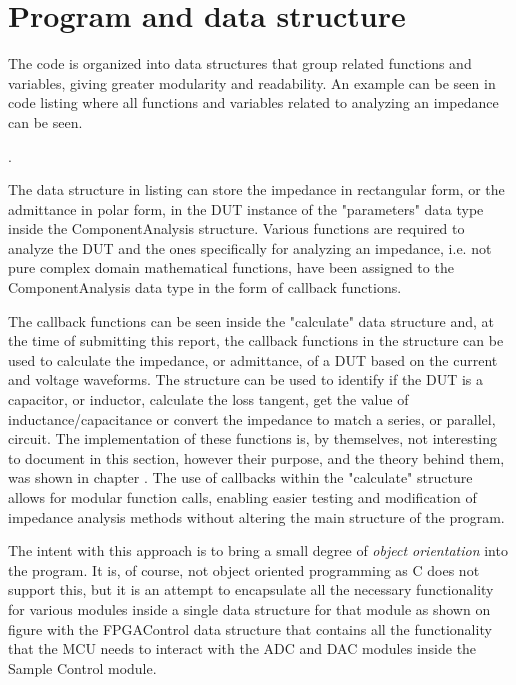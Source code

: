 \section{Program and data structure} \label{subsec:ProgramStructure}
The code is organized into data structures that group related functions and variables, giving greater modularity and readability. An example can be seen in code listing  where all functions and variables related to analyzing an impedance can be seen.

. 

The data structure in listing  can store the impedance in rectangular form, or the admittance in polar form, in the DUT instance of the "parameters" data type inside the ComponentAnalysis structure. Various functions are required to analyze the DUT and the ones specifically for analyzing an impedance, i.e. not pure complex domain mathematical functions, have been assigned to the ComponentAnalysis data type in the form of callback functions.

The callback functions can be seen inside the "calculate" data structure and, at the time of submitting this report, the callback functions in the structure can be used to calculate the impedance, or admittance, of a DUT based on the current and voltage waveforms. The structure can be used to identify if the DUT is a capacitor, or inductor, calculate the loss tangent, get the value of inductance/capacitance or convert the impedance to match a series, or parallel, circuit. The implementation of these functions is, by themselves, not interesting to document in this section, however their purpose, and the theory behind them, was shown in chapter . The use of callbacks within the "calculate" structure allows for modular function calls, enabling easier testing and modification of impedance analysis methods without altering the main structure of the program.

The intent with this approach is to bring a small degree of \textit{object orientation} into the program. It is, of course, not object oriented programming as C does not support this, but it is an attempt to encapsulate all the necessary functionality for various modules inside a single data structure for that module as shown on figure  with the FPGAControl data structure that contains all the functionality that the MCU needs to interact with the ADC and DAC modules inside the Sample Control module.

